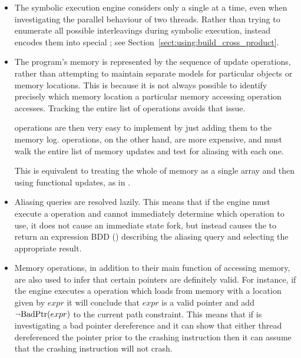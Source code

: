 \begin{itemize}
\item The symbolic execution engine considers only a single
  {\StateMachine} at a time, even when investigating the parallel
  behaviour of two threads.  Rather than trying to enumerate all
  possible interleavings during symbolic execution, {\technique}
  instead encodes them into special 
  {\StateMachines}; see Section~\ref{sect:using:build_cross_product}.

\item The program's memory is represented by the sequence of update
  operations, rather than attempting to maintain separate models for
  particular objects or memory locations.  This is because it is not
  always possible to identify precisely which memory location a
  particular memory accessing operation accesses.  Tracking the entire
  list of operations avoids that issue.

   operations are then very easy to implement by just
  adding them to the memory log.   operations, on the
  other hand, are more expensive, and must walk the entire list of
  memory updates and test for aliasing with each one.

  This is equivalent to treating the whole of memory as a single array
  and then using functional updates, as in \needCite{}.  


\item Aliasing queries are resolved lazily.  This means that if the
  engine must execute a  operation and cannot immediately
  determine which  operation to use, it does not cause an
  immediate state fork, but instead causes the  to return
  an expression BDD () describing the aliasing
  query and selecting the appropriate result.    

\item Memory operations, in addition to their main function of
  accessing memory, are also used to infer that certain pointers are
  definitely valid.  For instance, if the engine executes a
   operation which loads from memory with a location given
  by $\mathit{expr}$ it will conclude that $\mathit{expr}$ is a valid
  pointer and add ${\neg}\mathrm{BadPtr}(expr)$ to the current path
  constraint.  This means that if {\technique} is investigating a bad
  pointer dereference and it can show that either thread dereferenced
  the pointer prior to the crashing instruction then it can assume
  that the crashing instruction will not crash.


\end{itemize}

